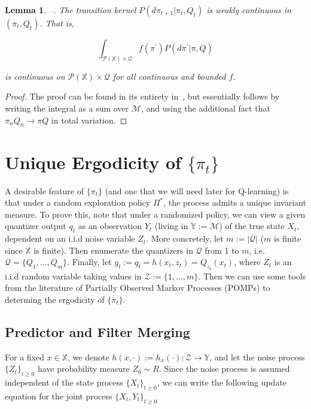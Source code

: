 \documentclass{article}
\newtheorem{lemma}[theorem]{Lemma}
\begin{document}
\begin{lemma}\label{lemma:weak}~\cite[Lemma 11]{Linder}.
    The transition kernel \( P(d\pi_{t+1}|\pi_t,Q_t) \) is weakly continuous in \( (\pi_t,Q_t) \). That is,

    \[ \int_{\mathcal{P}(\mathbb{X}) \times \mathcal{Q}} f(\pi^{'})P(d \pi^{'}|\pi, Q) \]

    is continuous on \( \mathcal{P}(\mathbb{X}) \times \mathcal{Q} \) for all continuous and bounded \(f\).
\end{lemma}

\begin{proof}
    The proof can be found in its entirety in~\cite{Linder}, but essentially follows by writing the integral as a sum over \( \mathcal{M} \), and using the additional fact that \( \pi_n Q_n \to \pi Q \) in total variation.
\end{proof}

\section{Unique Ergodicity of \( \{\pi_t\} \)}\label{section:unique-ergodicity}
A desirable feature of \( \{\pi_t\} \) (and one that we will need later for Q-learning) is that under a random exploration policy \( \Pi^* \), the process admits a unique invariant measure. To prove this, note that under a randomized policy, we can view a given quantizer output \( q_t \) as an observation \( Y_t \) (living in \( \mathbb{Y} := \mathcal{M} \)) of the true state \( X_t \), dependent on an i.i.d noise variable \( Z_t \). More concretely, let \( m := |\mathcal{Q}| \) (\( m \) is finite since \( \mathbb{X} \) is finite). Then enumerate the quantizers in \( \mathcal{Q} \) from 1 to \( m \), i.e. \( \mathcal{Q} = \{ Q_1,\ldots,Q_m \} \). Finally, let \( y_t := q_t = h(x_t,z_t) = Q_{z_t}(x_t) \), where \( Z_t \) is an i.i.d random variable taking values in \( \mathcal{Z} := \{1,\ldots,m\} \). Then we can use some tools from the literature of Partially Observed Markov Processes (POMPs) to determing the ergodicity of \( \{\pi_t\} \).

\subsection{Predictor and Filter Merging}

For a fixed \( x \in \mathbb{X} \), we denote \( h(x,\cdot) := h_x(\cdot) : \mathcal{Z} \to \mathbb{Y} \), and let the noise process \( \{Z_t\}_{t\ge0} \) have probability measure \( Z_0 \sim R \). Since the noise process is assumed independent of the state process \( \{X_t\}_{t\ge0} \), we can write the following update equation for the joint process \( \{X_t,Y_t\}_{t\ge0} \) %
\end{document}
